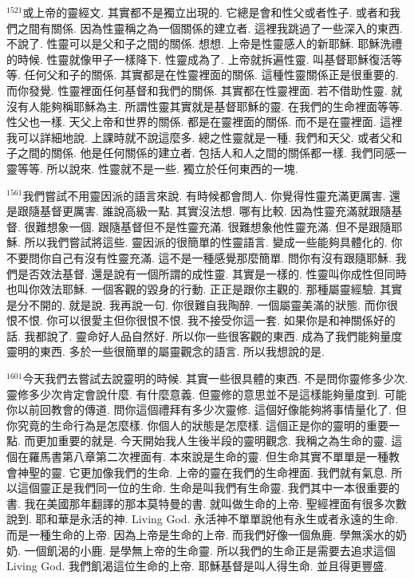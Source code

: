 \documentclass{book}
\begin{document}
$^{1521}$或上帝的靈經文.
其實都不是獨立出現的.
它總是會和性父或者性子.
或者和我們之間有關係.
因為性靈稱之為一個關係的建立者.
這裡我跳過了一些深入的東西.
不說了.
性靈可以是父和子之間的關係.
想想.
上帝是性靈感人的新耶穌.
耶穌洗禮的時候.
性靈就像甲子一樣降下.
性靈成為了.
上帝就拆遍性靈.
叫基督耶穌復活等等.
任何父和子的關係.
其實都是在性靈裡面的關係.
這種性靈關係正是很重要的.
而你發覺.
性靈裡面任何基督和我們的關係.
其實都在性靈裡面.
若不借助性靈.
就沒有人能夠稱耶穌為主.
所謂性靈其實就是基督耶穌的靈.
在我們的生命裡面等等.
性父也一樣.
天父上帝和世界的關係.
都是在靈裡面的關係.
而不是在靈裡面.
這裡我可以詳細地說.
上課時就不說這麼多.
總之性靈就是一種.
我們和天父.
或者父和子之間的關係.
他是任何關係的建立者.
包括人和人之間的關係都一樣.
我們同感一靈等等.
所以說來.
性靈就不是一些.
獨立於任何東西的一塊.

$^{1561}$我們嘗試不用靈因派的語言來說.
有時候都會問人.
你覺得性靈充滿更厲害.
還是跟隨基督更厲害.
誰說高級一點.
其實沒法想.
哪有比較.
因為性靈充滿就跟隨基督.
很難想象一個.
跟隨基督但不是性靈充滿.
很難想象他性靈充滿.
但不是跟隨耶穌.
所以我們嘗試將這些.
靈因派的很簡單的性靈語言.
變成一些能夠具體化的.
你不要問你自己有沒有性靈充滿.
這不是一種感覺那麼簡單.
問你有沒有跟隨耶穌.
我們是否效法基督.
還是說有一個所謂的成性靈.
其實是一樣的.
性靈叫你成性但同時也叫你效法耶穌.
一個客觀的毀身的行動.
正正是跟你主觀的.
那種屬靈經驗.
其實是分不開的.
就是說.
我再說一句.
你很難自我陶醉.
一個屬靈美滿的狀態.
而你很恨不恨.
你可以很愛主但你很恨不恨.
我不接受你這一套.
如果你是和神關係好的話.
我都說了.
靈命好人品自然好.
所以你一些很客觀的東西.
成為了我們能夠量度靈明的東西.
多於一些很簡單的屬靈觀念的語言.
所以我想說的是.

$^{1601}$今天我們去嘗試去說靈明的時候.
其實一些很具體的東西.
不是問你靈修多少次.
靈修多少次肯定會說什麼.
有什麼意義.
但靈修的意思並不是這樣能夠量度到.
可能你以前回教會的傳道.
問你這個禮拜有多少次靈修.
這個好像能夠將事情量化了.
但你究竟的生命行為是怎麼樣.
你個人的狀態是怎麼樣.
這個正是你的靈明的重要一點.
而更加重要的就是.
今天開始我人生後半段的靈明觀念.
我稱之為生命的靈.
這個在羅馬書第八章第二次裡面有.
本來說是生命的靈.
但生命其實不單單是一種教會神聖的靈.
它更加像我們的生命.
上帝的靈在我們的生命裡面.
我們就有氣息.
所以這個靈正是我們同一位的生命.
生命是叫我們有生命靈.
我們其中一本很重要的書.
我在美國那年翻譯的那本莫特曼的書.
就叫做生命的上帝.
聖經裡面有很多次數說到.
耶和華是永活的神.
Living God.
永活神不單單說他有永生或者永遠的生命.
而是一種生命的上帝.
因為上帝是生命的上帝.
而我們好像一個魚鹿.
學無溪水的奶奶.
一個飢渴的小鹿.
是學無上帝的生命靈.
所以我們的生命正是需要去追求這個Living God.
我們飢渴這位生命的上帝.
耶穌基督是叫人得生命.
並且得更豐盛.
\end{document}
